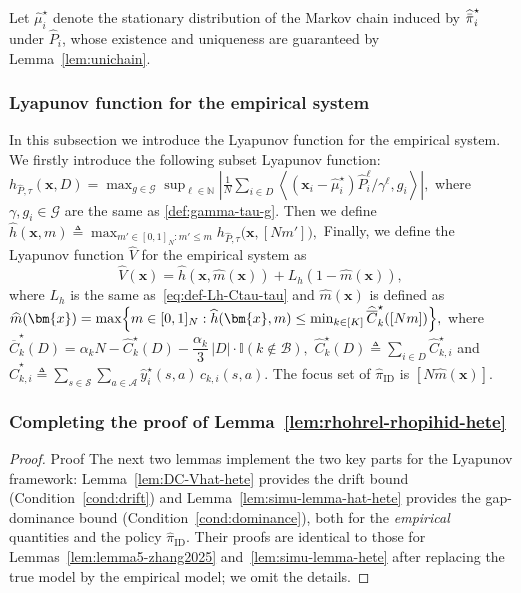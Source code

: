 \documentclass[mnsc,nonblindrev]{informs3}
\newcommand{\Phat}{\widehat{P}}
\newcommand{\pihid}{\widehat{\pi}_{\mathrm{ID}}}
\newcommand{\pihbst}{\widehat{\Bar{\pi}}^\star}
\newcommand{\hhat}{\widehat{h}}
\newcommand{\bmx}{\bm{x}}
\newcommand{\States}{\mathcal{S}}
\newcommand{\Actions}{\mathcal{A}}
\newcommand{\yhat}{\widehat{y}}
\newcommand{\muhst}{\widehat{\mu}^\star}
\begin{document}
\begin{APPENDICES}
Let \(\muhst_i\) denote the stationary distribution of the Markov chain
induced by \(\pihbst_i\) under \(\Phat_i\), whose existence and uniqueness
are guaranteed by Lemma~\ref{lem:unichain}.

\subsubsection{Lyapunov function for the empirical system}\label{subsec:lya-hatsys}
In this subsection we introduce the Lyapunov function for the empirical system. We firstly introduce the following subset Lyapunov function:
$
    h_{\widehat{P},\tau}(\bmx,D)
    = \max_{g\in\mathcal{G}} \sup_{\ell\in\mathbb{N}}
    \left|\frac{1}{N}\sum_{i\in D}\left\langle(\bmx_i - \widehat\mu_i^\star)\widehat{P}_i^{\ell}/\gamma^{\ell},g_i\right\rangle\right|,
$
where \(\gamma, g_i\in\mathcal{G}\) are the same as \eqref{def:gamma-tau-g}. Then we define 
$
    \widehat{h}(\bmx,m)\triangleq\max_{m'\in[0,1]_N: m'\le m}h_{\widehat{P},\tau}\bigl(\bmx,[N m']\bigr),
$
Finally, we define the Lyapunov function $\widehat{V}$ for the empirical system as
\begin{equation}\label{def:vhat-hete}
    \widehat{V}(\bmx)=\widehat{h}(\bmx,\widehat m(\bmx))+L_h(1-\widehat m(\bmx)),
\end{equation}
where $L_h$ is the same as~\eqref{eq:def-Lh-Ctau-tau} and $\widehat m(\bmx)$ is defined as 
$
    \widehat m(\bmx)
    = \max\Bigl\{m \in [0,1]_N :\hhat(\bmx,m)
    \le \min_{k\in[K]} \widehat{\overline{C}}_k^{\star}([Nm]) \Bigr\},
$
where 
$
    \widehat{\overline C}_k^\star(D)
    =
    \alpha_k N - \widehat{C}_k^\star(D) - \dfrac{\alpha_k}{3}\,|D| \cdot \mathbb{I}(k\not\in\mathcal B), 
$
$
    \widehat C_k^\star(D)\triangleq \sum_{i\in D} \widehat C_{k,i}^\star
$
and
$
    \widehat C_{k,i}^\star\triangleq \sum_{s\in\States}\sum_{a\in\Actions} \yhat_i^\star(s,a)\, c_{k,i}(s,a).
$
The focus set of $\pihid$ is $[N\widehat{m}(\bmx)]$.


\subsubsection{Completing the proof of Lemma~\ref{lem:rhohrel-rhopihid-hete}}\label{subsec:complete-pf-2part-hete}



\begin{proof}{Proof}
The next two lemmas implement the two key parts for the Lyapunov framework: Lemma~\ref{lem:DC-Vhat-hete} provides the drift bound (Condition~\ref{cond:drift}) and Lemma~\ref{lem:simu-lemma-hat-hete} provides the gap-dominance bound (Condition~\ref{cond:dominance}), both for the \emph{empirical} quantities and the policy $\pihid$.
Their proofs are identical to those for Lemmas~\ref{lem:lemma5-zhang2025} and~\ref{lem:simu-lemma-hete} after replacing the true model by the empirical model; we omit the details.


\end{proof}
\end{APPENDICES}
\end{document}
